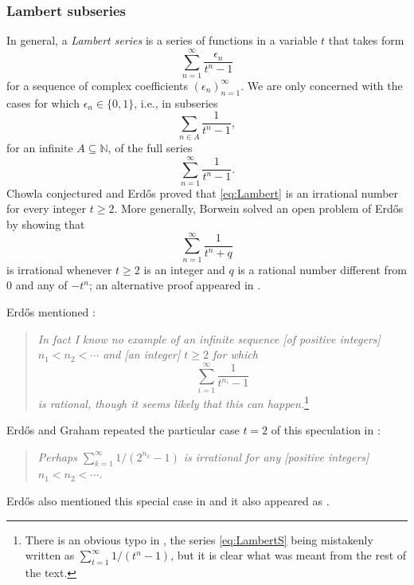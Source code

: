 \documentclass[11pt,letterpaper,reqno]{amsart}
\numberwithin{equation}{section}
\theoremstyle{definition}
\numberwithin{equation}{section}
\begin{document}

\subsubsection{Lambert subseries}
In general, a \emph{Lambert series} is a series of functions in a variable $t$ that takes form
\[ \sum_{n=1}^{\infty} \frac{\epsilon_n}{t^n-1} \]
for a sequence of complex coefficients $(\epsilon_n)_{n=1}^{\infty}$.
We are only concerned with the cases for which $\epsilon_n\in\{0,1\}$, i.e., in subseries
\begin{equation}\label{eq:LambertS2}
\sum_{n\in A} \frac{1}{t^n-1},
\end{equation}
for an infinite $A\subseteq\mathbb{N}$, of the full series
\begin{equation}\label{eq:Lambert}
\sum_{n=1}^{\infty} \frac{1}{t^n-1}.
\end{equation}
Chowla \cite{Cho47} conjectured and Erd\H{o}s \cite{Erd48} proved that \eqref{eq:Lambert} is an irrational number for every integer $t\geqslant 2$. More generally, Borwein \cite{Bor91,Bor92} solved an open problem of Erd\H{o}s by showing that
\[ \sum_{n=1}^{\infty} \frac{1}{t^n+q} \]
is irrational whenever $t\geqslant 2$ is an integer and $q$ is a rational number different from $0$ and any of $-t^n$; an alternative proof appeared in \cite{AZ98}.

Erd\H{o}s mentioned \cite[p.~222]{E68}:
\begin{quote}
\emph{In fact I know no example of an infinite sequence [of positive integers] $n_1<n_2<\cdots$ and [an integer] $t\geqslant 2$ for which
\begin{equation}\label{eq:LambertS}
\sum_{i=1}^{\infty} \frac{1}{t^{n_i}-1}
\end{equation}
is rational, though it seems likely that this can happen.}\footnote{There is an obvious typo in \cite[Formula (2)]{E68}, the series \eqref{eq:LambertS} being mistakenly written as $\sum_{t=1}^{\infty}1/(t^n-1)$, but it is clear what was meant from the rest of the text.}
\end{quote}
Erd\H{o}s and Graham repeated the particular case $t=2$ of this speculation in \cite[p.~62]{EG80}:
\begin{quote}
\emph{Perhaps $\sum_{k=1}^{\infty} 1/(2^{n_k}-1)$ is irrational for any [positive integers] $n_1<n_2<\cdots$.}
\end{quote}
Erd\H{o}s also mentioned this special case in \cite[p.~105]{Erd88} and it also appeared as \cite[Problem \#257]{EP}.
\end{document}
